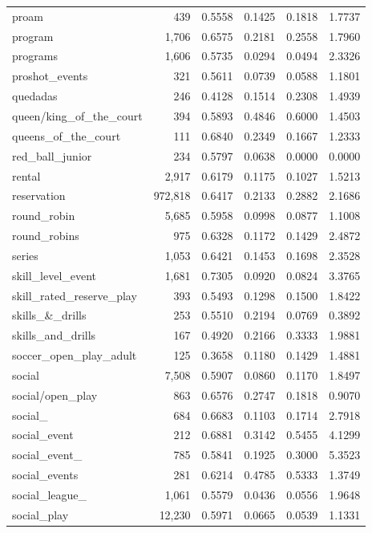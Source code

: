 \begin{table}[htbp]
\begin{tabular}{lrrrrr}
  proam & 439 & 0.5558 & 0.1425 & 0.1818 & 1.7737 \\
  program & 1,706 & 0.6575 & 0.2181 & 0.2558 & 1.7960 \\
  programs & 1,606 & 0.5735 & 0.0294 & 0.0494 & 2.3326 \\
  proshot\_events & 321 & 0.5611 & 0.0739 & 0.0588 & 1.1801 \\
  quedadas & 246 & 0.4128 & 0.1514 & 0.2308 & 1.4939 \\
  queen/king\_of\_the\_court & 394 & 0.5893 & 0.4846 & 0.6000 & 1.4503 \\
  queens\_of\_the\_court & 111 & 0.6840 & 0.2349 & 0.1667 & 1.2333 \\
  red\_ball\_junior & 234 & 0.5797 & 0.0638 & 0.0000 & 0.0000 \\
  rental & 2,917 & 0.6179 & 0.1175 & 0.1027 & 1.5213 \\
  reservation & 972,818 & 0.6417 & 0.2133 & 0.2882 & 2.1686 \\
  round\_robin & 5,685 & 0.5958 & 0.0998 & 0.0877 & 1.1008 \\
  round\_robins & 975 & 0.6328 & 0.1172 & 0.1429 & 2.4872 \\
  series & 1,053 & 0.6421 & 0.1453 & 0.1698 & 2.3528 \\
  skill\_level\_event & 1,681 & 0.7305 & 0.0920 & 0.0824 & 3.3765 \\
  skill\_rated\_reserve\_play & 393 & 0.5493 & 0.1298 & 0.1500 & 1.8422 \\
  skills\_\&\_drills & 253 & 0.5510 & 0.2194 & 0.0769 & 0.3892 \\
  skills\_and\_drills & 167 & 0.4920 & 0.2166 & 0.3333 & 1.9881 \\
  soccer\_open\_play\_adult & 125 & 0.3658 & 0.1180 & 0.1429 & 1.4881 \\
  social & 7,508 & 0.5907 & 0.0860 & 0.1170 & 1.8497 \\
  social/open\_play & 863 & 0.6576 & 0.2747 & 0.1818 & 0.9070 \\
  social\_ & 684 & 0.6683 & 0.1103 & 0.1714 & 2.7918 \\
  social\_event & 212 & 0.6881 & 0.3142 & 0.5455 & 4.1299 \\
  social\_event\_ & 785 & 0.5841 & 0.1925 & 0.3000 & 5.3523 \\
  social\_events & 281 & 0.6214 & 0.4785 & 0.5333 & 1.3749 \\
  social\_league\_ & 1,061 & 0.5579 & 0.0436 & 0.0556 & 1.9648 \\
  social\_play & 12,230 & 0.5971 & 0.0665 & 0.0539 & 1.1331 \\

\end{tabular}
\end{table}

